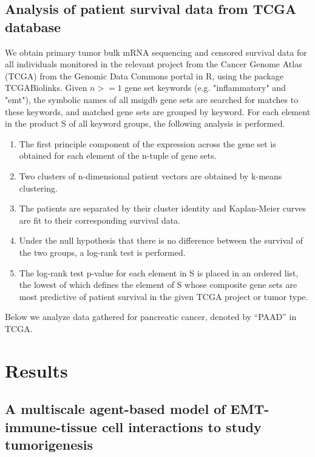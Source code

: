 \documentclass[11pt]{article}
\begin{document}
\subsection{Analysis of patient survival data from TCGA database}
We obtain primary tumor bulk mRNA sequencing and censored survival data for all individuals monitored in the relevant project from the Cancer Genome Atlas (TCGA) from the Genomic Data Commons portal in R, using the package TCGABiolinks.  Given $n >= 1$ gene set keywords (e.g. "inflammatory" and "emt"), the symbolic names of all msigdb gene sets are searched for matches to these keywords, and matched gene sets are grouped by keyword. For each element in the product S of all keyword groups, the following analysis is performed.
\begin{enumerate}
     \item The first principle component of the expression across the gene set is obtained for each element of the n-tuple of gene sets.
     \item Two clusters of n-dimensional patient vectors are obtained by k-means clustering.
     \item The patients are separated by their cluster identity and Kaplan-Meier curves are fit to their corresponding survival data.
     \item Under the null hypothesis that there is no difference between the survival of the two groups, a log-rank test is performed.
     \item The log-rank test p-value for each element in S is placed in an ordered list, the lowest of which defines the element of S whose composite gene sets are most predictive of patient survival in the given TCGA project or tumor type.
\end{enumerate}
Below we analyze data gathered for pancreatic cancer, denoted by ``PAAD'' in TCGA.     




\section{Results}

\subsection{A multiscale agent-based model of EMT-immune-tissue cell interactions to study tumorigenesis}\label{ExplModel}
\end{document}
